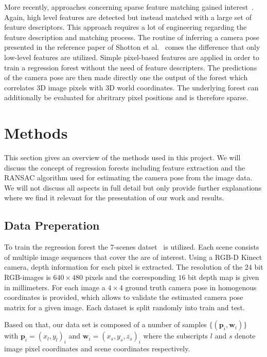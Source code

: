 \documentclass[final]{cvpr}
\begin{document}
More recently, approaches concerning sparse feature matching gained interest~\cite{Holzer2012}. Again, high level features are detected but 
instead matched with a large set of feature descriptors. This approach requires a lot of engineering regarding the feature
description and matching process. The routine of inferring a camera pose presented in the reference paper of Shotton et al.~\cite{shotton2013}
comes the difference that only low-level features are utilized. Simple pixel-based features are applied in order to train a
regression forest without the need of feature descripters. The predictions of the camera pose are then made directly one the
output of the forest which correlates 3D image pixels with 3D world coordinates. The underlying forest can additionally be 
evaluated for abritrary pixel positions and is therefore sparse.


\section{Methods}
This section gives an overview of the methods used in this project. We will discuss
the concept of regression forests including feature extraction and the RANSAC algorithm
used for estimating the camera pose from the image data. We will not discuss all aspects
in full detail but only provide further explanations where we find it relevant
for the presentation of our work and results.

\subsection{Data Preperation}
To train the regression forest the 7-scenes datset~\cite{glocker2013} is utilized. 
Each scene consists of multiple image sequences that cover the are of interest. Using a RGB-D 
Kinect camera, depth information for each pixel is extracted. The resolution of the $24$ 
bit RGB-images is $640\times480$ pixels and the corresponding $16$ bit depth map is given 
in millimeters. For each image a $4\times4$ ground truth camera pose in homogenous coordinates 
is provided, which allows to validate the estimated camera pose matrix for a given image. 
Each dataset is split randomly into train and test. 

Based on that, our data set is composed of a number of samples $\{(\boldsymbol{p}_i, \boldsymbol{w}_i)\}$ with
$\boldsymbol{p}_i = (x_l, y_l)_i$ and $\boldsymbol{w}_i = (x_s, y_s, z_s)_i$ where the subscripts
$l$ and $s$ denote image pixel coordinates and scene coordinates respectively.\\
\end{document}
